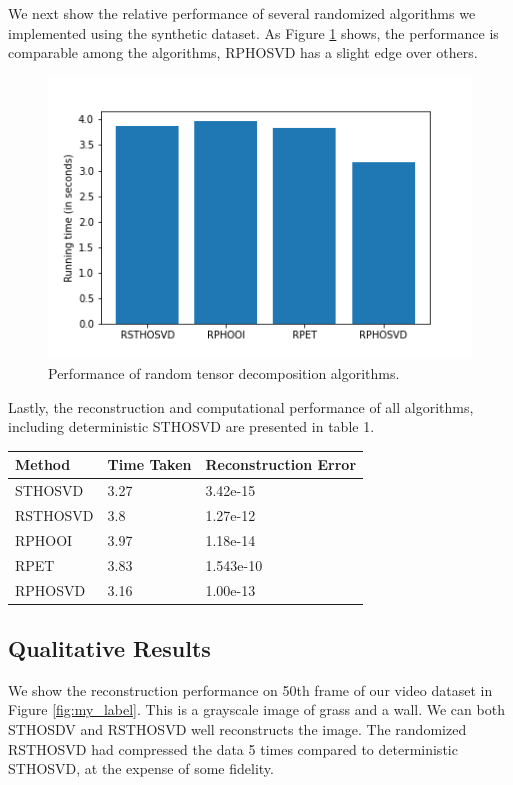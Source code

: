 \documentclass[preprint]{elsarticle}
\begin{document}
We next show the relative performance of several randomized algorithms we implemented using the synthetic dataset. As Figure \ref{fig:booh} shows, the performance is comparable among the algorithms, RPHOSVD has a slight edge over others. 

\begin{figure}
    \centering
    \includegraphics[scale=.7]{figs/runtime.png}
    \caption{Performance of random tensor decomposition algorithms.}
    \label{fig:booh}
\end{figure}

Lastly, the reconstruction and computational performance of all algorithms, including deterministic STHOSVD are presented in table 1.

\begin{center}
\begin{tabular}{lll}
\toprule
  Method & Time Taken & Reconstruction Error \\
\midrule
 STHOSVD &       3.27 &             3.42e-15 \\
RSTHOSVD &        3.8 &             1.27e-12 \\
  RPHOOI &       3.97 &             1.18e-14 \\
    RPET &       3.83 &            1.543e-10 \\
 RPHOSVD &       3.16 &             1.00e-13 \\
\bottomrule
\end{tabular}
\end{center}

\subsection{Qualitative Results}
We show the reconstruction performance on 50th frame of our video dataset in Figure \ref{fig:my_label}. This is a grayscale image of grass and a wall. We can both STHOSDV and RSTHOSVD well reconstructs the image. The randomized RSTHOSVD had compressed the data 5 times compared to deterministic STHOSVD, at the expense of some fidelity.
\end{document}
